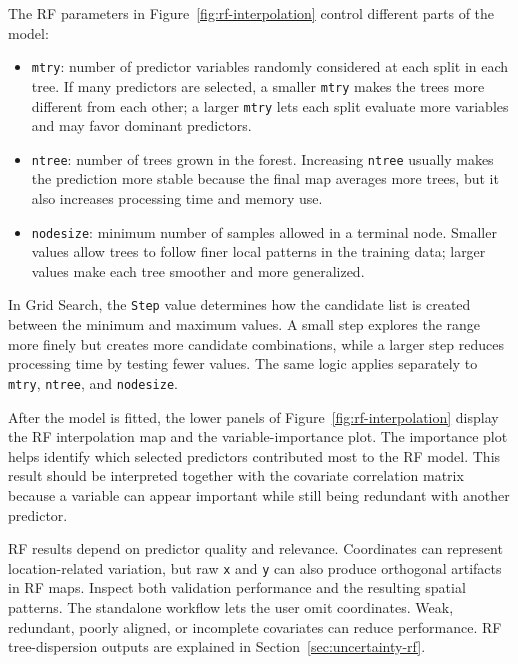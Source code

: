 \documentclass[11pt,a4paper]{article}
\begin{document}
The RF parameters in Figure~\ref{fig:rf-interpolation} control different parts of the model:


\begin{itemize}
    \item \texttt{mtry}: number of predictor variables randomly considered at each split in each tree. If many predictors are selected, a smaller \texttt{mtry} makes the trees more different from each other; a larger \texttt{mtry} lets each split evaluate more variables and may favor dominant predictors.


    \item \texttt{ntree}: number of trees grown in the forest. Increasing \texttt{ntree} usually makes the prediction more stable because the final map averages more trees, but it also increases processing time and memory use.


    \item \texttt{nodesize}: minimum number of samples allowed in a terminal node. Smaller values allow trees to follow finer local patterns in the training data; larger values make each tree smoother and more generalized.
\end{itemize}


In Grid Search, the \texttt{Step} value determines how the candidate list is created between the minimum and maximum values. A small step explores the range more finely but creates more candidate combinations, while a larger step reduces processing time by testing fewer values. The same logic applies separately to \texttt{mtry}, \texttt{ntree}, and \texttt{nodesize}.


After the model is fitted, the lower panels of Figure~\ref{fig:rf-interpolation} display the RF interpolation map and the variable-importance plot. The importance plot helps identify which selected predictors contributed most to the RF model. This result should be interpreted together with the covariate correlation matrix because a variable can appear important while still being redundant with another predictor.


\begin{infobox}
RF results depend on predictor quality and relevance. Coordinates can represent location-related variation, but raw \texttt{x} and \texttt{y} can also produce orthogonal artifacts in RF maps. Inspect both validation performance and the resulting spatial patterns. The standalone workflow lets the user omit coordinates. Weak, redundant, poorly aligned, or incomplete covariates can reduce performance. RF tree-dispersion outputs are explained in Section~\ref{sec:uncertainty-rf}.
\end{infobox}
\end{document}
